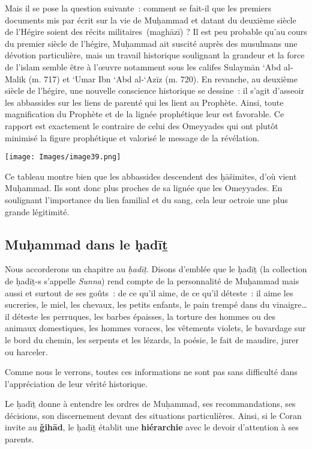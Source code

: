 Mais il se pose la question suivante~: comment se fait-il que les
premiers documents mis par écrit sur la vie de Muḥammad et datant du
deuxième siècle de l'Hégire soient des récits militaires~(maghāzī) ? Il
est peu probable qu'au cours du premier siècle de l'hégire, Muḥammad ait
suscité auprès des musulmans une dévotion particulière, mais un travail
historique soulignant la grandeur et la force de l'islam semble être à
l'œuvre notamment sous les califes Sulaymān `Abd al-Malik (m. 717) et
`Umar Ibn `Abd al-`Azīz (m. 720). En revanche, au deuxième siècle de
l'hégire, une nouvelle conscience historique se dessine~: il s'agit
d'asseoir les abbassides sur les liens de parenté qui les lient au
Prophète. Ainsi, toute magnification du Prophète et de la lignée
prophétique leur est favorable. Ce rapport est exactement le contraire
de celui des Omeyyades qui ont plutôt minimisé la figure prophétique et
valorisé le message de la révélation.

\texttt{[image: Images/image39.png]}

Ce tableau montre bien que les abbassides descendent des ḥāšimites, d'où
vient Muḥammad. Ils sont donc plus proches de sa lignée que les
Omeyyades. En soulignant l'importance du lien familial et du sang, cela
leur octroie une plus grande légitimité.

 
\subsection{Muḥammad dans le ḥadīṯ
 }

Nous accorderons un chapitre au \emph{ḥadīṯ}. Disons d'emblée que le
ḥadīṯ (la collection de ḥadīṯ-s s'appelle \emph{Sunna}) rend compte de
la personnalité de Muḥammad mais aussi et surtout de ses goûts~: de ce
qu'il aime, de ce qu'il déteste~: il aime les sucreries, le miel, les
chevaux, les petits enfants, le pain trempé dans du vinaigre\ldots{} il
déteste les perruques, les barbes épaisses, la torture des hommes ou des
animaux domestiques, les hommes voraces, les vêtements violets, le
bavardage sur le bord du chemin, les serpents et les lézards, la poésie,
le fait de maudire, jurer ou harceler.

Comme nous le verrons, toutes ces informations ne sont pas sans
difficulté dans l'appréciation de leur vérité historique.

Le ḥadīṯ donne à entendre les ordres de Muḥammad, ses recommandations,
ses décisions, son discernement devant des situations particulières.
Ainsi, si le Coran invite au \textbf{ǧihād}, le ḥadīṯ établit une
\textbf{hiérarchie} avec le devoir d'attention à ses parents.

